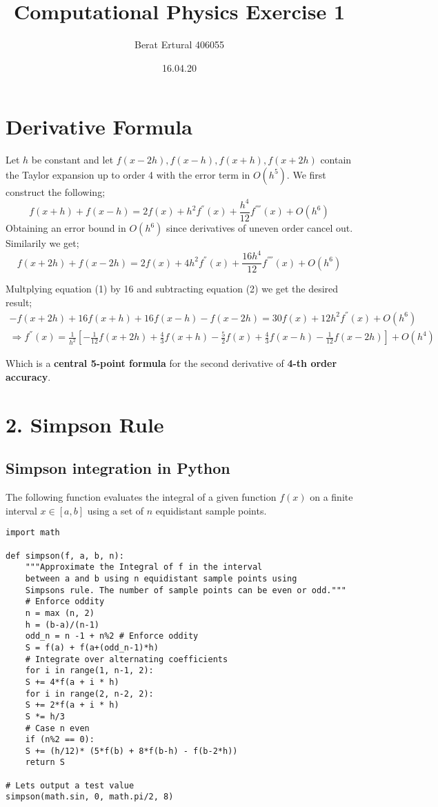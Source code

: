 \documentclass[11pt]{article}
\author{Berat Ertural 406055}
\date{16.04.20}
\title{Computational Physics Exercise 1}
\begin{document}
\maketitle
\tableofcontents



\section{Derivative Formula}
\label{sec:org7b24678}

Let \(h\) be constant and let \(f(x-2h),f(x-h),f(x+h),f(x+2h)\) 
contain the Taylor expansion up to order 4 with the error term in \(O(h^5)\). 
We first construct the following;
\begin{equation}
f(x+h) + f(x-h) = 2f(x)+h^2 f^{''}(x)+ \frac{h^4}{12} f^{''''}(x) + O(h^6)
\end{equation}
Obtaining an error bound in \(O(h^6)\) since derivatives of uneven order cancel out. Similarily we get;
\begin{equation}
f(x+2h) + f(x-2h) = 2f(x)+4 h^2 f^{''}(x)+ \frac{16 h^4}{12} f^{''''}(x) +O(h^6)
\end{equation}

Multplying equation (1) by 16 and subtracting equation (2) we get the desired result;
\begin{multline}
-f(x+2h)+16f(x+h)+16f(x-h)-f(x-2h) = 30f(x)+ 12 h^2 f^{''}(x) + O(h^6) \\
\Rightarrow f^{''}(x) = \frac{1}{h^2}[-\frac{1}{12}f(x+2h)+\frac{4}{3}f(x+h)-\frac{5}{2}f(x)+\frac{4}{3}f(x-h)-\frac{1}{12}f(x-2h)] + O(h^4)
\end{multline}

Which is a \textbf{central 5-point formula} for the second derivative of \textbf{4-th order accuracy}.

\section{2. Simpson Rule}
\label{sec:org21d5b58}
\subsection{Simpson integration in Python}
\label{sec:org80be0c9}
The following function evaluates the integral of a given function \(f(x)\) on a finite interval 
\(x \in [a,b]\) using a set of \(n\) equidistant sample points.

\begin{verbatim}
import math

def simpson(f, a, b, n):
    """Approximate the Integral of f in the interval
    between a and b using n equidistant sample points using 
    Simpsons rule. The number of sample points can be even or odd."""
    # Enforce oddity
    n = max (n, 2)
    h = (b-a)/(n-1)
    odd_n = n -1 + n%2 # Enforce oddity
    S = f(a) + f(a+(odd_n-1)*h)
    # Integrate over alternating coefficients
    for i in range(1, n-1, 2):
	S += 4*f(a + i * h)
    for i in range(2, n-2, 2):
	S += 2*f(a + i * h)
    S *= h/3
    # Case n even
    if (n%2 == 0):
	S += (h/12)* (5*f(b) + 8*f(b-h) - f(b-2*h))
    return S

# Lets output a test value
simpson(math.sin, 0, math.pi/2, 8)
\end{verbatim}
\end{document}

